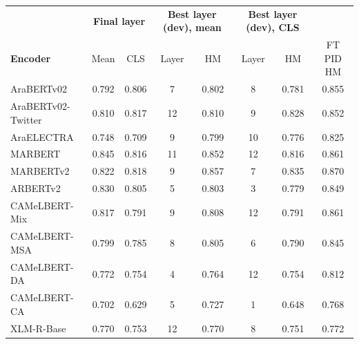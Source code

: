 \begin{tabular}{lcc|cc|cc|c}
\toprule
 & \multicolumn{2}{c|}{\textbf{Final layer}} & \multicolumn{2}{c|}{\textbf{Best layer (dev), mean}} & \multicolumn{2}{c|}{\textbf{Best layer (dev), CLS}} & \\
\textbf{Encoder} & Mean & CLS & Layer & HM & Layer & HM & FT PID HM \\
\midrule
AraBERTv02 & 0.792 & 0.806 & 7 & 0.802 & 8 & 0.781 & 0.855 \\
AraBERTv02-Twitter & 0.810 & 0.817 & 12 & 0.810 & 9 & 0.828 & 0.852 \\
AraELECTRA & 0.748 & 0.709 & 9 & 0.799 & 10 & 0.776 & 0.825 \\
MARBERT & 0.845 & 0.816 & 11 & 0.852 & 12 & 0.816 & 0.861 \\
MARBERTv2 & 0.822 & 0.818 & 9 & 0.857 & 7 & 0.835 & 0.870 \\
ARBERTv2 & 0.830 & 0.805 & 5 & 0.803 & 3 & 0.779 & 0.849 \\
CAMeLBERT-Mix & 0.817 & 0.791 & 9 & 0.808 & 12 & 0.791 & 0.861 \\
CAMeLBERT-MSA & 0.799 & 0.785 & 8 & 0.805 & 6 & 0.790 & 0.845 \\
CAMeLBERT-DA & 0.772 & 0.754 & 4 & 0.764 & 12 & 0.754 & 0.812 \\
CAMeLBERT-CA & 0.702 & 0.629 & 5 & 0.727 & 1 & 0.648 & 0.768 \\
XLM-R-Base & 0.770 & 0.753 & 12 & 0.770 & 8 & 0.751 & 0.772 \\
\bottomrule
\end{tabular}
